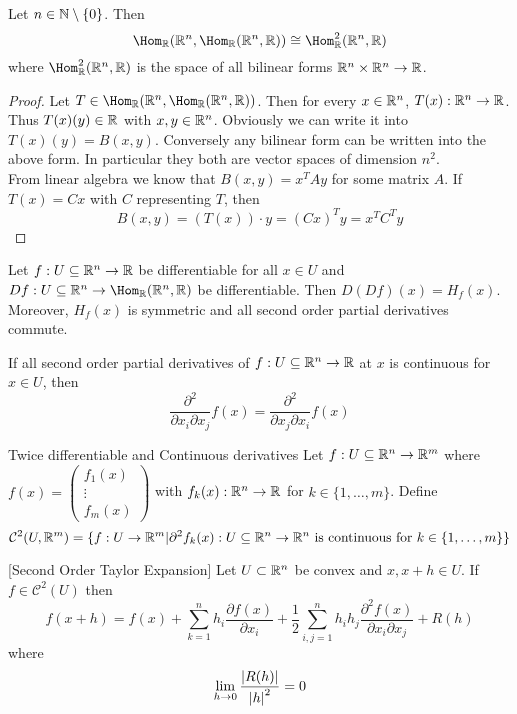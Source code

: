 \documentclass[a4paper]{article}
\begin{document}
\begin{prp}{}{} Let $n\in\mathbb{N}\setminus\{0\}$. Then $$\Hom_\R(\R^n,\Hom_\R(\R^n,\R))\cong\Hom_\R^2(\R^n,\R)$$ where $\Hom_\R^2(\R^n,\R)$ is the space of all bilinear forms $\mathbb{R}^n\times\mathbb{R}^n\to\mathbb{R}$. 
\begin{proof}
Let $T\in\Hom_\R(\R^n,\Hom_\R(\R^n,\R))$. Then for every $x\in\mathbb{R}^n$, $T(x):\mathbb{R}^n\to\mathbb{R}$. Thus $T(x)(y)\in\mathbb{R}$ with $x,y\in\mathbb{R}^n$. Obviously we can write it into $T(x)(y)=B(x,y)$. Conversely any bilinear form can be written into the above form. In particular they both are vector spaces of dimension $n^2$. \\
From linear algebra we know that $B(x,y)=x^TAy$ for some matrix $A$. If $T(x)=Cx$ with $C$ representing $T$, then $$B(x,y)=(T(x))\cdot y=(Cx)^Ty=x^TC^Ty$$
\end{proof}
\end{prp}

\begin{prp}{}{} Let $f:U\subseteq\mathbb{R}^n\to\mathbb{R}$ be differentiable for all $x\in U$ and $Df:U\subseteq\R^n\to\Hom_\R(\R^n,\R)$ be differentiable. Then $D(Df)(x)=H_f(x)$. Moreover, $H_f(x)$ is symmetric and all second order partial derivatives commute. 
\end{prp}

\begin{lmm}{}{} If all second order partial derivatives of $f:U\subseteq\mathbb{R}^n\to\mathbb{R}$ at $x$ is continuous for $x\in U$, then $$\frac{\partial^2}{\partial x_i\partial x_j}f(x)=\frac{\partial^2}{\partial x_j\partial x_i}f(x)$$
\end{lmm}

\begin{defn}{Twice differentiable and Continuous derivatives}{} Let $f:U\subseteq\mathbb{R}^n\to\mathbb{R}^m$ where $f(x)=\begin{pmatrix}f_1(x)\\\vdots\\f_m(x)\end{pmatrix}$ with $f_k(x):\mathbb{R}^n\to\mathbb{R}$ for $k\in\{1,\dots,m\}$. Define $$\mathcal{C}^2(U,\mathbb{R}^m)=\{f:U\to\mathbb{R}^m|\partial^2f_k(x):U\subseteq\mathbb{R}^n\to\mathbb{R}^n\text{ is continuous for }k\in\{1,\dots,m\}\}$$
\end{defn}

\begin{thm}{}{}[Second Order Taylor Expansion] Let $U\subset\mathbb{R}^n$ be convex and $x,x+h\in U$. If $f\in\mathcal{C}^2(U)$ then $$f(x+h)=f(x)+\sum_{k=1}^nh_i\frac{\partial f(x)}{\partial x_i}+\frac{1}{2}\sum_{i,j=1}^nh_ih_j\frac{\partial^2f(x)}{\partial x_i\partial x_j}+R(h)$$ where $$\lim_{h\to 0}\frac{\abs{R(h)}}{\abs{h}^2}=0$$
\end{thm}
\end{document}
